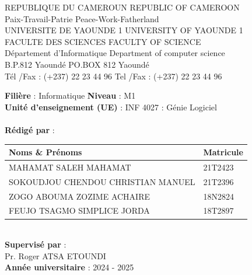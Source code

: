 \documentclass[14pt,a4paper]{report}
\begin{document}
\begin{titlepage}
    \begin{center}
        {\large REPUBLIQUE DU CAMEROUN \hfill REPUBLIC OF CAMEROON}\\
        {\small Paix-Travail-Patrie \hfill Peace-Work-Fatherland}\\[0.5cm]
        {\large UNIVERSITE DE YAOUNDE 1 \hfill UNIVERSITY OF YAOUNDE 1}\\
        {\large FACULTE DES SCIENCES \hfill FACULTY OF SCIENCE}\\
        {\large Département d'Informatique \hfill Department of computer science}\\
        {\small B.P.812 Yaoundé \hfill PO.BOX 812 Yaoundé}\\
        {\small Tél /Fax : (+237) 22 23 44 96 \hfill Tel /Fax : (+237) 22 23 44 96}\\[2cm]

        \begin{center}
            {\large \textbf{Filière} : Informatique \hspace{2cm} \textbf{Niveau} : M1}\\
            {\large \textbf{Unité d'enseignement (UE)} : INF 4027 : Génie Logiciel}\\[2cm]

            \\[2cm]

            \textbf{Rédigé par} :\\[0.5cm]
            \begin{tabular}{|l|l|}
                \hline
                \textbf{Noms \& Prénoms} & \textbf{Matricule} \\
                \hline
                MAHAMAT SALEH MAHAMAT & 21T2423 \\
                \hline
                SOKOUDJOU CHENDOU CHRISTIAN MANUEL & 21T2396 \\
                \hline
                ZOGO ABOUMA ZOZIME ACHAIRE & 18N2824 \\
                \hline
                FEUJO TSAGMO SIMPLICE JORDA & 18T2897 \\
                \hline
            \end{tabular}\\[2cm]

            \textbf{Supervisé par} :\\
            Pr. Roger ATSA ETOUNDI\\[1cm]

            \textbf{Année universitaire} : 2024 - 2025
        \end{center}
    \end{center}
\end{titlepage}
\end{document}
